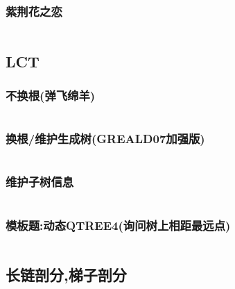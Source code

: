 \documentclass[a4paper]{article}
\begin{document}
\begin{multicols}{2}
				\subsubsection{紫荆花之恋}
					\inputminted{cpp}{../src/datastructure/紫荆花之恋.cpp}

				\subsection{LCT}
					\subsubsection{不换根(弹飞绵羊)}
						\inputminted{cpp}{../src/datastructure/LCT(不换根).cpp}
				
					\subsubsection{换根/维护生成树(GREALD07加强版)}
						\inputminted{cpp}{../src/datastructure/GREALD07.cpp}

					\subsubsection{维护子树信息}
						\inputminted{cpp}{../src/datastructure/LCT维护子树信息.cpp}
					
					\subsubsection{模板题:动态QTREE4(询问树上相距最远点)}
						\inputminted{cpp}{../src/datastructure/动态QTREE4.cpp}







				\subsection{长链剖分,梯子剖分}
					\inputminted{cpp}{../src/datastructure/长链剖分.cpp}
				

\end{multicols}
\end{document}
